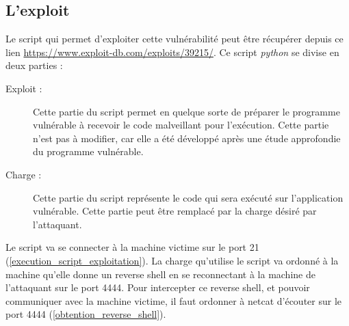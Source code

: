     \subsection{L'exploit}
    Le script qui permet d'exploiter cette vulnérabilité peut être récupérer depuis ce lien 
    \url{https://www.exploit-db.com/exploits/39215/}.
    Ce script \emph{python} se divise en deux parties :
    \begin{description}
        \item[Exploit :] Cette partie du script permet en quelque sorte de préparer le programme vulnérable à 
            recevoir le code malveillant pour l'exécution. Cette partie n'est pas à modifier, car elle a été développé
            après une étude approfondie du programme vulnérable.

        \item[Charge :] Cette partie du script représente le code qui sera exécuté sur l'application vulnérable. 
            Cette partie peut être remplacé par la charge désiré par l'attaquant.
    \end{description}

    Le script va se connecter à la machine victime sur le port 21 (\autoref{execution_script_exploitation}). 
    La charge qu'utilise le 
    script va ordonné à la machine qu'elle donne un reverse shell en se reconnectant à la machine de l'attaquant 
    sur le port 4444. Pour intercepter ce reverse shell, et pouvoir communiquer avec
    la machine victime, il faut ordonner à netcat d'écouter sur le port 4444 (\autoref{obtention_reverse_shell}).

